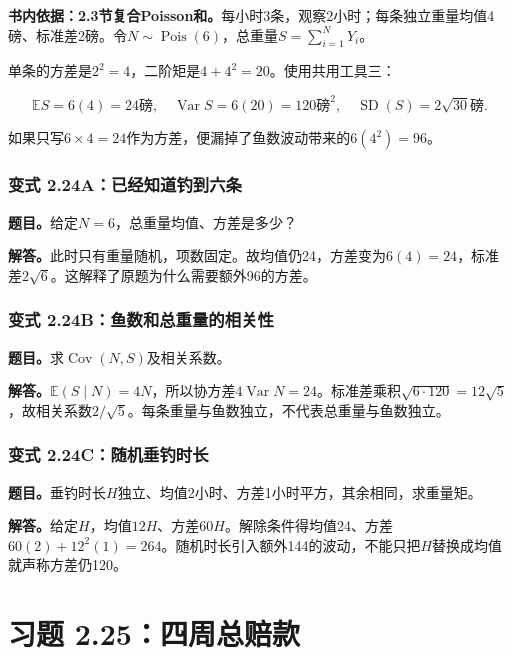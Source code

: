 \documentclass[12pt,a4paper,UTF8,fontset=fandol]{ctexart}
\begin{document}
\textbf{书内依据：2.3节复合Poisson和。}每小时3条，观察2小时；每条独立重量均值4磅、标准差2磅。令\(N\sim\operatorname{Pois}(6)\)，总重量\(S=\sum_{i=1}^NY_i\)。

单条的方差是\(2^2=4\)，二阶矩是\(4+4^2=20\)。使用共用工具三：

\[\boxed{\mathbb ES=6(4)=24\text{磅},\quad
\operatorname{Var}S=6(20)=120\text{磅}^2,\quad
\operatorname{SD}(S)=2\sqrt{30}\text{磅}.}\]

如果只写\(6\times4=24\)作为方差，便漏掉了鱼数波动带来的\(6(4^2)=96\)。

\subsubsection{变式
2.24A：已经知道钓到六条}\label{ux53d8ux5f0f-2.24aux5df2ux7ecfux77e5ux9053ux9493ux5230ux516dux6761}

\textbf{题目。}给定\(N=6\)，总重量均值、方差是多少？

\textbf{解答。}此时只有重量随机，项数固定。故均值仍24，方差变为\(6(4)=24\)，标准差\(2\sqrt6\)。这解释了原题为什么需要额外96的方差。

\subsubsection{变式
2.24B：鱼数和总重量的相关性}\label{ux53d8ux5f0f-2.24bux9c7cux6570ux548cux603bux91cdux91cfux7684ux76f8ux5173ux6027}

\textbf{题目。}求\(\operatorname{Cov}(N,S)\)及相关系数。

\textbf{解答。}\(\mathbb E(S\mid N)=4N\)，所以协方差\(4\operatorname{Var}N=24\)。标准差乘积\(\sqrt{6\cdot120}=12\sqrt5\)，故相关系数\(2/\sqrt5\)。每条重量与鱼数独立，不代表总重量与鱼数独立。

\subsubsection{变式
2.24C：随机垂钓时长}\label{ux53d8ux5f0f-2.24cux968fux673aux5782ux9493ux65f6ux957f}

\textbf{题目。}垂钓时长\(H\)独立、均值2小时、方差1小时平方，其余相同，求重量矩。

\textbf{解答。}给定\(H\)，均值\(12H\)、方差\(60H\)。解除条件得均值24、方差\(60(2)+12^2(1)=264\)。随机时长引入额外144的波动，不能只把\(H\)替换成均值就声称方差仍120。

\section{习题
2.25：四周总赔款}\label{ux4e60ux9898-2.25ux56dbux5468ux603bux8d54ux6b3e}
\end{document}
